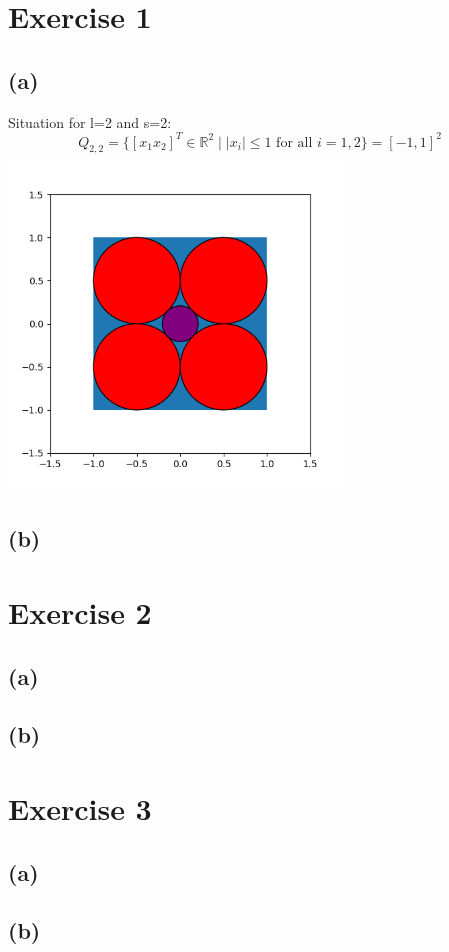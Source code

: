 \documentclass[12pt]{article}
\begin{document}
\section*{Exercise 1}
\subsection*{(a)}
Situation for l=2 and s=2:
\[Q_{2,2}=\lbrace [x_1 x_2]^T\in\mathbb{R}^2\mid |x_i|\leq 1 \text{ for all } i=1,2\rbrace = [-1,1]^2\]
\includegraphics[width=3.5in]{code/exercise_01_a.png}
\subsection*{(b)}

\section*{Exercise 2}
\subsection*{(a)}
\subsection*{(b)}

\section*{Exercise 3}
\subsection*{(a)}
\subsection*{(b)}
\end{document}
